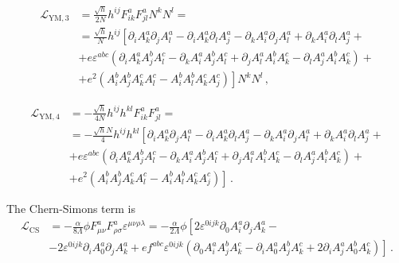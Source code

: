 \begin{align}
\mathcal{L}_{\text{YM},3} & = \frac{\sqrt{h}}{2 N} h^{ij} F^a_{ik} F^a_{jl} N^k N^l = \nonumber \\
& = \frac{\sqrt{h}}{N} h^{ij} \left[\partial_i A^a_k \partial_j A^a_l - \partial_i A^a_k \partial_l A^a_j - \partial_k A^a_i \partial_j A^a_l + \partial_k A^a_i \partial_l A^a_j +\right. \nonumber \\
& + e \varepsilon^{abc} \left(\partial_i A^a_k A^b_j A^c_l - \partial_k A^a_i A^b_j A^c_l + \partial_j A^a_l A^b_i A^c_k - \partial_l A^a_j A^b_i A^c_k\right) + \nonumber \\
& \left. + e^2 \left(A^b_i A^b_j A^c_k A^c_l - A^b_i A^b_l A^c_k A^c_j\right)\right] N^k N^l \,,
\end{align}

\begin{align}
\mathcal{L}_{\text{YM},4} & = - \frac{\sqrt{h}}{4 N} h^{ij} h^{kl} F^a_{ik} F^a_{jl} = \nonumber \\
& = - \frac{\sqrt{h} N}{4} h^{ij} h^{kl} \left[\partial_i A^a_k \partial_j A^a_l - \partial_i A^a_k \partial_l A^a_j - \partial_k A^a_i \partial_j A^a_l + \partial_k A^a_i \partial_l A^a_j +\right. \nonumber \\
& + e \varepsilon^{abc} \left(\partial_i A^a_k A^b_j A^c_l - \partial_k A^a_i A^b_j A^c_l + \partial_j A^a_l A^b_i A^c_k - \partial_l A^a_j A^b_i A^c_k\right) + \nonumber \\
& \left. + e^2 \left(A^b_i A^b_j A^c_k A^c_l - A^b_i A^b_l A^c_k A^c_j\right)\right]\,.
\end{align}

The Chern-Simons term is
\begin{align}
\mathcal{L}_{\text{CS}} & = - \frac{\alpha}{8 \Lambda} \phi F^a_{\mu \nu} F^{a}_{\rho \sigma} \varepsilon^{\mu \nu \rho \lambda} = -\frac{\alpha}{2 \Lambda} \phi \left[2 \varepsilon^{0ijk} \partial_0 A^a_i \partial_j A^a_k - \right. \nonumber \\
& \left. - 2 \varepsilon^{0ijk} \partial_i A^a_0 \partial_j A^a_k  + e f^{abc} \varepsilon^{0ijk} \left(\partial_0 A^a_i A^b_j A^c_k - \partial_i A^a_0 A^b_j A^c_k + 2 \partial_i A^a_j A^b_0 A^c_k\right)  \right]\,.
\end{align}

